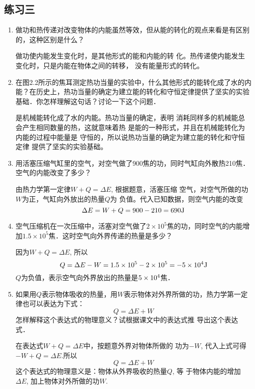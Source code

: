 \subsection{练习三}
\begin{enumerate}
		\item 做功和热传递对改变物体的内能虽然等效，但从能的转化的观点来看是有区别的，这种区别是什么？
		
\begin{solution}
    做功使内能发生变化时，是其他形式的能和内能的转
化。热传递使内能发生变化时，只是内能在物体之间的转移，
没有能量形式的转化。
\end{solution}
	\item 在图2.2所示的焦耳测定热功当量的实验中，什么其他形式的能转化成了水的内能？在历史上，热功当量的确定为建立能的转化和守恒定律提供了坚实的实验基础．你怎样理解这句话？讨论一下这个问题．
		
    \begin{solution}
    是机械能转化成了水的内能。热功当量的确定，表明
    消耗同样多的机械能总会产生相同数量的热，这就意味着热
    是能的一种形式，并且在机械能转化为内能的过程中能量是
    守恒的，所以说热功当量的确定为建立能的转化和守恒定律
    提供了坚实的实验基础。
    \end{solution}
	\item 用活塞压缩气缸里的空气，对空气做了900焦的功，同时气缸向外散热210焦．空气的内能改变了多少？
	
\begin{solution}
由热力学第一定律$W+Q=\Delta E$, 根据题意，活塞压缩
空气，对空气所做的功$W$为正，气缸向外放出的热量$Q$为
负值。代入已知数据，则空气内能的改变
\[\Delta E=W+Q=900-210=690{\rm J}\]
\end{solution}
	\item 空气压缩机在一次压缩中，活塞对空气做了$2\times 10^5$焦的功，同时空气的内能增加$1.5\times 10^5$焦．这时空气向外界传递的热量是多少？
		
    \begin{solution}
因为$W+Q=\Delta E$, 所以
\[Q=\Delta E-W=1.5\times10^5-2\times10^5 =-5\times10^4{\rm J}\]
$Q$为负值，表示空气向外界放出的热量是$5\times10^4$焦．
    \end{solution}
	\item 如果用$Q$表示物体吸收的热量，用$W$表示物体对外界所做的功，热力学第一定律也可以表达为下式：
	\[Q=\Delta E+W\]
	怎样解释这个表达式的物理意义？试根据课文中的表达式推
导出这个表达式．
		
\begin{solution}
    在表达式$W+Q=\Delta E$中，按题意外界对物体所做的
功为$-W$, 代入上式可得$-W+Q=\Delta E$.所以
\[Q=\Delta E+W\]
这个表达式的物理意义是：物体从外界吸收的热量$Q$, 等
于物体内能的增加$\Delta E$, 加上物体对外所做的功$W$.
\end{solution}
\end{enumerate}

